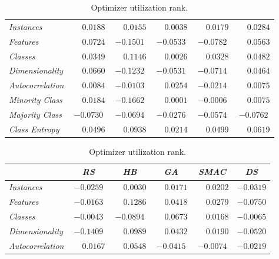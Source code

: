 \begin{table}[ht]
\begin{subtable}{\textwidth}
\begin{tabular}{l|ccccc}
            \hline
            \textit{Instances} & $\phantom{-}0.0188$ & $\phantom{-}0.0155$ & $\phantom{-}0.0038$ & $\phantom{-}0.0179$ & $\phantom{-}0.0284$ \\
            \textit{Features} & $\phantom{-}0.0724$ & $-0.1501$ & $-0.0533$ & $-0.0782$ & $\phantom{-}0.0563$ \\
            \textit{Classes} & $\phantom{-}0.0349$ & $\phantom{-}0.1146$ & $\phantom{-}0.0026$ & $\phantom{-}0.0328$ & $\phantom{-}0.0482$ \\
            \textit{Dimensionality} & $\phantom{-}0.0660$ &$ -0.1232$ & $-0.0531$ & $-0.0714$ & $\phantom{-}0.0464$ \\
            \textit{Autocorrelation} & $\phantom{-}0.0084$ & $-0.0103$ & $\phantom{-}0.0254$ & $-0.0214$ & $\phantom{-}0.0075$ \\
            \textit{Minority Class} & $\phantom{-}0.0184$ & $-0.1662$ & $\phantom{-}0.0001$ & $-0.0006$ & $\phantom{-}0.0075$ \\
            \textit{Majority Class} & $-0.0730$ & $-0.0694$ & $-0.0276$ & $-0.0574$ & $-0.0762$ \\
            \textit{Class Entropy} & $\phantom{-}0.0496$ & $\phantom{-}0.0938$ & $\phantom{-}0.0214$ & $\phantom{-}0.0499$ & $\phantom{-}0.0619$ \\
            \hline
        \end{tabular}
    \end{subtable}
    \par\bigskip
    \begin{subtable}{\textwidth}
        \centering
        \caption{Optimizer utilization rank.}
        \begin{tabular}{l|ccccc}
            & \textit{RS} & \textit{HB} & \textit{GA} & \textit{SMAC} & \textit{DS} \\
            \hline
            \textit{Instances} & $-0.0259$ & $\phantom{-}0.0030$ & $\phantom{-}0.0171$ & $\phantom{-}0.0202$ & $-0.0319$ \\
            \textit{Features} & $-0.0163$ & $\phantom{-}0.1286$ & $\phantom{-}0.0418$ & $\phantom{-}0.0279$ & $-0.0750$ \\
            \textit{Classes} & $-0.0043$ & $-0.0894$ & $\phantom{-}0.0673$ & $\phantom{-}0.0168$ & $-0.0065$ \\
            \textit{Dimensionality} & $-0.1409$ & $\phantom{-}0.0989$ & $\phantom{-}0.0432$ & $\phantom{-}0.0190$ & $-0.0520$ \\
            \textit{Autocorrelation} & $\phantom{-}0.0167$ & $\phantom{-}0.0548$ & $-0.0415$ & $-0.0074$ & $-0.0219$ \\

\end{tabular}
\end{subtable}
\end{table}
